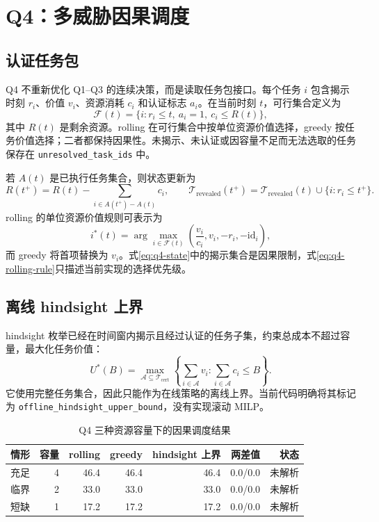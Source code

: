 \section{Q4：多威胁因果调度}

\subsection{认证任务包}

Q4 不重新优化 Q1--Q3 的连续决策，而是读取任务包接口。每个任务 $i$ 包含揭示时刻 $r_i$、价值 $v_i$、资源消耗 $c_i$ 和认证标志 $a_i$。在当前时刻 $t$，可行集合定义为
\begin{equation}
  \mathcal{F}(t)=\{i:r_i\le t,\ a_i=1,\ c_i\le R(t)\},
  \label{eq:q4-feasible}
\end{equation}
其中 $R(t)$ 是剩余资源。rolling 在可行集合中按单位资源价值选择，greedy 按任务价值选择；二者都保持因果性。未揭示、未认证或因容量不足而无法选取的任务保存在 \texttt{unresolved\_task\_ids} 中。

若 $A(t)$ 是已执行任务集合，则状态更新为
\begin{equation}
  R(t^+)=R(t)-\sum_{i\in A(t^+)-A(t)}c_i,
  \qquad
  \mathcal{T}_{\mathrm{revealed}}(t^+)=
  \mathcal{T}_{\mathrm{revealed}}(t)\cup\{i:r_i\le t^+\}.
  \label{eq:q4-state}
\end{equation}
rolling 的单位资源价值规则可表示为
\begin{equation}
  i^*(t)=\arg\max_{i\in\mathcal{F}(t)}
  \left(\frac{v_i}{c_i},v_i,-r_i,-\mathrm{id}_i\right),
  \label{eq:q4-rolling-rule}
\end{equation}
而 greedy 将首项替换为 $v_i$。式\eqref{eq:q4-state}中的揭示集合是因果限制，式\eqref{eq:q4-rolling-rule}只描述当前实现的选择优先级。

\subsection{离线 hindsight 上界}

hindsight 枚举已经在时间窗内揭示且经过认证的任务子集，约束总成本不超过容量，最大化任务价值：
\begin{equation}
  U^*(B)=\max_{\mathcal{A}\subseteq\mathcal{T}_{\mathrm{cert}}}
  \left\{\sum_{i\in\mathcal{A}}v_i:\sum_{i\in\mathcal{A}}c_i\le B\right\}.
  \label{eq:q4-hindsight}
\end{equation}
它使用完整任务集合，因此只能作为在线策略的离线上界。当前代码明确将其标记为 \texttt{offline\_hindsight\_upper\_bound}，没有实现滚动 MILP。

\begin{table}[!htbp]
\centering
\caption{Q4 三种资源容量下的因果调度结果}
\label{tab:q4-results}
\begin{tabular}{lrrrrrr}
\toprule
情形 & 容量 & rolling & greedy & hindsight 上界 & 两差值 & 状态 \\
\midrule
充足 & 4 & 46.4 & 46.4 & 46.4 & 0.0/0.0 & 未解析 \\
临界 & 2 & 33.0 & 33.0 & 33.0 & 0.0/0.0 & 未解析 \\
短缺 & 1 & 17.2 & 17.2 & 17.2 & 0.0/0.0 & 未解析 \\
\bottomrule
\end{tabular}
\end{table}

